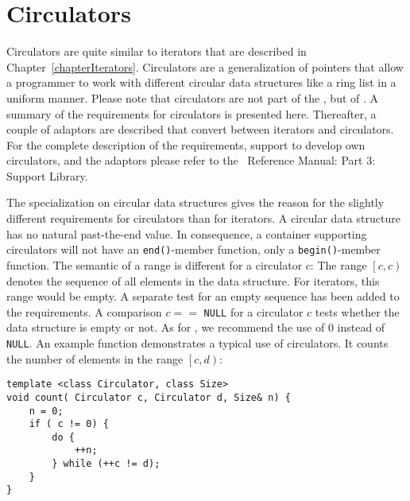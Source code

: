 
\cleardoublepage
\chapter{Circulators}
\label{sectionCirculatorWarning}

Circulators are quite similar to iterators that are described in
Chapter~\ref{chapterIterators}. Circulators are a generalization of
pointers that allow a programmer to work with different circular data
structures like a ring list in a uniform manner. Please note that
circulators are not part of the \stl, but of \cgal. A summary of the
requirements for circulators is presented here. Thereafter, a couple
of adaptors are described that convert between iterators and
circulators. For the complete description of the requirements, support
to develop own circulators, and the adaptors please refer to the \cgal\ 
Reference Manual: Part 3: Support Library.

The specialization on circular data structures gives the reason for
the slightly different requirements for circulators than for
iterators. A circular data structure has no natural past-the-end
value. In consequence, a container supporting circulators will not
have an {\tt end()}-member function, only a {\tt begin()}-member
function.  The semantic of a range is different for a circulator $c$:
The range $\left[c, c\right)$ denotes the sequence of all elements in
the data structure. For iterators, this range would be empty. A
separate test for an empty sequence has been added to the
requirements. A comparison $c ==$ {\tt NULL} for a circulator $c$
tests whether the data structure is empty or not. As for
\CC, we recommend the use of 0 instead of {\tt NULL}. An example
function demonstrates a typical use of circulators. It counts the
number of elements in the range $\left[c, d\right)$:

\begin{verbatim}
template <class Circulator, class Size>
void count( Circulator c, Circulator d, Size& n) {
    n = 0;
    if ( c != 0) {
        do {
            ++n;
        } while (++c != d);
    }
}
\end{verbatim}

